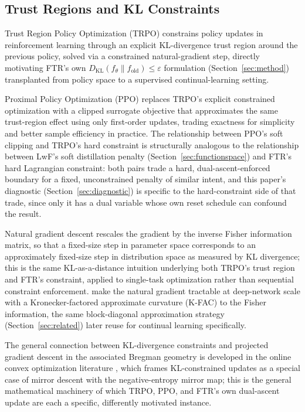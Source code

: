 \documentclass[11pt]{article}
\newcommand{\eps}{\varepsilon}
\begin{document}
\subsection{Trust Regions and KL Constraints}
\label{sec:trustregion}
Trust Region Policy Optimization (TRPO) \citep{schulman2015trust}
constrains policy updates in reinforcement learning through an explicit
KL-divergence trust region around the previous policy, solved via a
constrained natural-gradient step, directly motivating FTR's own
$D_{\mathrm{KL}}(f_\theta\|f_{\mathrm{old}})\le\eps$ formulation
(Section~\ref{sec:method}) transplanted from policy space to a
supervised continual-learning setting.

Proximal Policy Optimization (PPO) \citep{schulman2017proximal} replaces
TRPO's explicit constrained optimization with a clipped surrogate
objective that approximates the same trust-region effect using only
first-order updates, trading exactness for simplicity and better sample
efficiency in practice. The relationship between PPO's soft clipping and
TRPO's hard constraint is structurally analogous to the relationship
between LwF's soft distillation penalty (Section~\ref{sec:functionspace})
and FTR's hard Lagrangian constraint: both pairs trade a hard,
dual-ascent-enforced boundary for a fixed, unconstrained penalty of
similar intent, and this paper's diagnostic (Section~\ref{sec:diagnostic})
is specific to the hard-constraint side of that trade, since only it has a
dual variable whose own reset schedule can confound the result.

Natural gradient descent \citep{amari1998natural} rescales the gradient by
the inverse Fisher information matrix, so that a fixed-size step in
parameter space corresponds to an approximately fixed-size step in
distribution space as measured by KL divergence; this is the same
KL-as-a-distance intuition underlying both TRPO's trust region and FTR's
constraint, applied to single-task optimization rather than sequential
constraint enforcement. \citet{martens2015optimizing} make the natural
gradient tractable at deep-network scale with a Kronecker-factored
approximate curvature (K-FAC) to the Fisher information, the same
block-diagonal approximation strategy \citet{ritter2018online}
(Section~\ref{sec:related}) later reuse for continual learning
specifically.

The general connection between KL-divergence constraints and projected
gradient descent in the associated Bregman geometry is developed in the
online convex optimization literature \citep{hazan2019introduction,
rakhlin2012online,shalevshwartz2012online}, which frames KL-constrained
updates as a special case of mirror descent with the negative-entropy
mirror map; this is the general mathematical machinery of which TRPO,
PPO, and FTR's own dual-ascent update are each a specific, differently
motivated instance.
\end{document}
